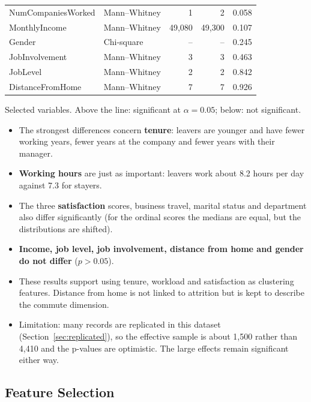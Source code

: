 \documentclass[12pt,a4paper]{article}
\begin{document}
\begin{table}[H]
\begin{tabular}{llrrr}
\midrule
NumCompaniesWorked      & Mann--Whitney & 1    & 2    & 0.058\\
MonthlyIncome           & Mann--Whitney & 49{,}080 & 49{,}300 & 0.107\\
Gender                  & Chi-square    & --   & --   & 0.245\\
JobInvolvement          & Mann--Whitney & 3    & 3    & 0.463\\
JobLevel                & Mann--Whitney & 2    & 2    & 0.842\\
DistanceFromHome        & Mann--Whitney & 7    & 7    & 0.926\\
\bottomrule
\end{tabular}

\footnotesize Selected variables. Above the line: significant at
$\alpha = 0.05$; below: not significant.
\end{table}

\begin{itemize}
  \item The strongest differences concern \textbf{tenure}: leavers are younger
  and have fewer working years, fewer years at the company and fewer years
  with their manager.
  \item \textbf{Working hours} are just as important: leavers work about 8.2
  hours per day against 7.3 for stayers.
  \item The three \textbf{satisfaction} scores, business travel, marital
  status and department also differ significantly (for the ordinal scores
  the medians are equal, but the distributions are shifted).
  \item \textbf{Income, job level, job involvement, distance from home and
  gender do not differ} ($p > 0.05$).
  \item These results support using tenure, workload and satisfaction as
  clustering features. Distance from home is not linked to attrition but is
  kept to describe the commute dimension.
  \item Limitation: many records are replicated in this dataset
  (Section~\ref{sec:replicated}), so the effective sample is about 1,500
  rather than 4,410 and the p-values are optimistic. The large effects remain
  significant either way.
\end{itemize}

\subsection{Feature Selection}
\end{document}
